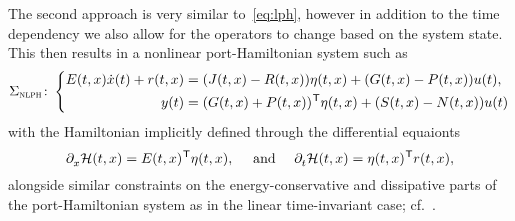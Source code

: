 \begin{remark}
    The second approach is very similar to~\eqref{eq:lph}, however in addition to the time dependency we also allow for the operators to change based on the system state.
    This then results in a nonlinear port-Hamiltonian system such as
    \begin{equation}\label{eq:nlph}
        \Sigma_{\msc{nlph}} \colon \left\lbrace
        \begin{aligned}
            E(t, x) \dot{x}(t) + r(t, x) &= (J(t, x) - R(t, x)) \eta(t, x) + (G(t, x) - P(t, x)) u(t), \\
            y(t) &= (G(t, x) + P(t, x))\trans \eta(t, x) + (S(t, x) - N(t, x)) u(t)
        \end{aligned}
        \right.
    \end{equation}
    with the Hamiltonian implicitly defined through the differential equaionts
    \begin{equation*}
        \pd{} \mcl{H}(t, x) = E(t, x)\trans \eta(t, x),\quad \text{ and }\quad \pd[t]{} \mcl{H}(t, x) = \eta(t, x)\trans r(t, x),
    \end{equation*}
    alongside similar constraints on the energy-conservative and dissipative parts of the port-Hamiltonian system as in the linear time-invariant case; cf.~\cite[Definition~4.1]{Mehrmann2022}.
\end{remark}

